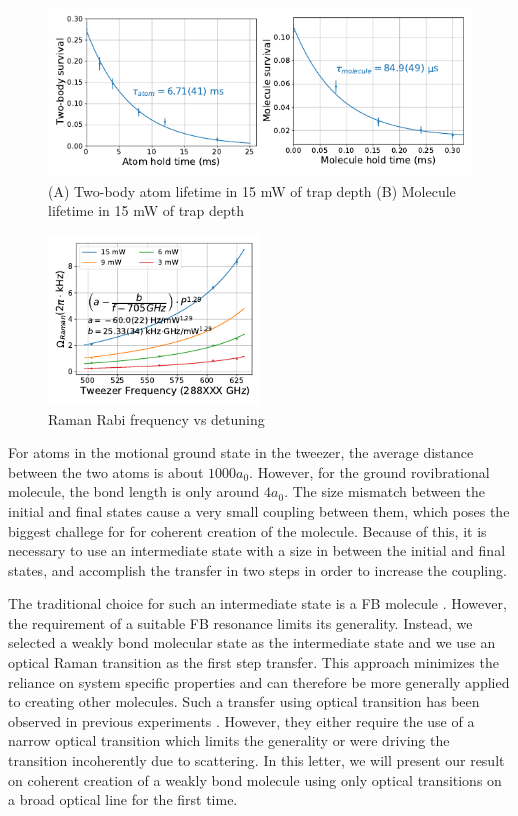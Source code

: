 \documentclass[aps,prl,twocolumn,groupedaddress]{revtex4-1}
\newcommand{\todo}[1]{}
\begin{document}
\begin{figure}
  \includegraphics[height=4.5cm]{fig3.pdf}
  \caption{
    (A) Two-body atom lifetime in 15 mW of trap depth \todo{lifetime number,
      subtraction of single body, photoassociation rate}
    (B) Molecule lifetime in 15 mW of trap depth \todo{lifetime number}
    \label{f-lifetime}}
\end{figure}

\begin{figure}
  \includegraphics[height=4.5cm]{fig4.pdf}
  \caption{Raman Rabi frequency vs detuning
    \label{f-det}}
\end{figure}

For atoms in the motional ground state in the tweezer,
the average distance between the two atoms is about $1000a_0$.
However, for the ground rovibrational molecule, the bond length is only around $4a_0$.
The size mismatch between the initial and final states cause a very small coupling between them,
which poses the biggest challege for for coherent creation of the molecule.
Because of this, it is necessary to use an intermediate state
with a size in between the initial and final states,
and accomplish the transfer in two steps in order to increase the coupling.

The traditional choice for such an intermediate state is a FB molecule \todo{cite our FB result}.
However, the requirement of a suitable FB resonance limits its generality. \todo{e.g. non-magnetic atoms?}
Instead, we selected a weakly bond molecular state as the intermediate state
and we use an optical Raman transition as the first step transfer.
This approach minimizes the reliance on system specific properties
and can therefore be more generally applied to creating other molecules.
Such a transfer using optical transition has been observed in previous experiments \todo{cite}.
However, they either require the use of a narrow optical transition which limits the generality
or were driving the transition incoherently due to scattering.
In this letter, we will present our result on coherent creation of a weakly bond molecule
using only optical transitions on a broad optical line for the first time.
\end{document}
